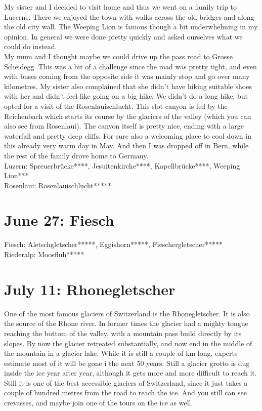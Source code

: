 My sister and I decided to visit home and thus we went on a family trip to Lucerne. There we enjoyed the town with walks across the old bridges and along the old city wall. The Weeping Lion is famous though a bit underwhelming in my opinion. In general we were done pretty quickly and asked ourselves what we could do instead.\\
My mum and I thought maybe we could drive up the pass road to Grosse Scheidegg. This was a bit of a challenge since the road was pretty tight, and even with buses coming from the opposite side it was mainly stop and go over many kilometres. My sister also complained that she didn't have hiking suitable shoes with her and didn't feel like going on a big hike. We didn't do a long hike, but opted for a visit of the Rosenlauischlucht. This slot canyon is fed by the Reichenbach which starts its course by the glaciers of the valley (which you can also see from Rosenlaui). The canyon itself is pretty nice, ending with a large waterfall and pretty deep cliffs. For sure also a welcoming place to cool down in this already very warm day in May. And then I was dropped off in Bern, while the rest of the family drove home to Germany.\\

Luzern: Spreuerbr\"ucke****, Jesuitenkirche****, Kapellbr\"ucke****, Weeping Lion***\\
Rosenlaui: Rosenlauischlucht*****

\section{June 27: Fiesch}
\label{Fiesch2010}

Fiesch: Aletschgletscher*****, Eggishorn*****, Fieschergletscher*****\\
Riederalp: Moosfluh*****

\section{July 11: Rhonegletscher}
\label{Rhonegletscher2010}

One of the most famous glaciers of Switzerland is the Rhonegletscher. It is also the source of the Rhone river. In former times the glacier had a mighty tongue reaching the bottom of the valley, with a mountain pass build directly by its slopes. By now the glacier retreated substantially, and now end in the middle of the mountain in a glacier lake. While it is still a couple of km long, experts estimate most of it will be gone i the next 50 years. Still a glacier grotto is dug inside the ice year after year, although it gets more and more difficult to reach it. Still it is one of the best accessible glaciers of Switzerland, since it just takes a couple of hundred metres from the road to reach the ice. And you still can see crevasses, and maybe join one of the tours on the ice as well.\\

